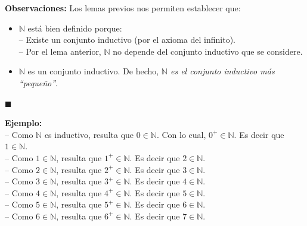 \documentclass[10 pt]{article}
\begin{document}
{\Large{\textbf{Observaciones:} Los lemas previos nos permiten establecer que:} \\

    \begin{itemize}
        
        \item \Large{$\mathbb N$ está bien definido porque: \\
        
        -- Existe un conjunto inductivo (por el axioma del infinito). \\
        
        -- Por el lema anterior, $\mathbb N$ no depende del conjunto inductivo que se considere.} \\

        \item \Large{$\mathbb N$ es un conjunto inductivo. De hecho, \textit{$\mathbb N$ es el conjunto inductivo más ``pequeño''}.} \\
\end{itemize}

\begin{flushright}
    $\blacksquare$
\end{flushright}

\Large{\textbf{Ejemplo:}} \\

\Large{-- Como $\mathbb N$ es inductivo, resulta que $0 \in \mathbb N$. Con lo cual, $0^+ \in \mathbb N$. Es decir que $1 \in \mathbb N$. \\

-- Como $1 \in \mathbb N$, resulta que $1^+ \in \mathbb N$. Es decir que $2 \in \mathbb N$. \\

-- Como $2 \in \mathbb N$, resulta que $2^+ \in \mathbb N$. Es decir que $3 \in \mathbb N$. \\

-- Como $3 \in \mathbb N$, resulta que $3^+ \in \mathbb N$. Es decir que $4\in \mathbb N$. \\

-- Como $4 \in \mathbb N$, resulta que $4^+ \in \mathbb N$. Es decir que $5 \in \mathbb N$. \\

-- Como $5 \in \mathbb N$, resulta que $5^+ \in \mathbb N$. Es decir que $6 \in \mathbb N$. \\

-- Como $6 \in \mathbb N$, resulta que $6^+ \in \mathbb N$. Es decir que $7 \in \mathbb N$. \\

}}
\end{document}

